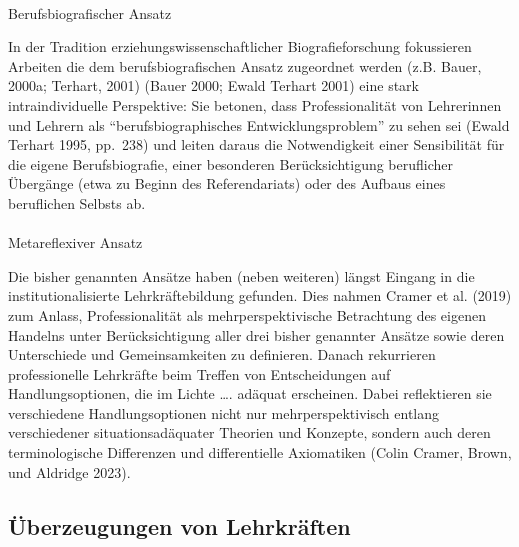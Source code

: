 \documentclass[
  letterpaper,
  DIV=11]{scrartcl}
\makeatletter
\let\oldparagraph\paragraph
\renewcommand{\paragraph}{
    \@ifstar
      \xxxParagraphStar
      \xxxParagraphNoStar
  }
\newcommand{\xxxParagraphStar}[1]{\oldparagraph*{#1}\mbox{}}
\newcommand{\xxxParagraphNoStar}[1]{\oldparagraph{#1}\mbox{}}
\makeatother
\begin{document}
\paragraph{Berufsbiografischer Ansatz}\label{berufsbiografischer-ansatz}

In der Tradition erziehungswissenschaftlicher Biografieforschung
fokussieren Arbeiten die dem berufsbiografischen Ansatz zugeordnet
werden (z.B. Bauer, 2000a; Terhart, 2001) (Bauer 2000; Ewald Terhart
2001) eine stark intraindividuelle Perspektive: Sie betonen, dass
Professionalität von Lehrerinnen und Lehrern als ``berufsbiographisches
Entwicklungsproblem'' zu sehen sei (Ewald Terhart 1995, pp.~238) und
leiten daraus die Notwendigkeit einer Sensibilität für die eigene
Berufsbiografie, einer besonderen Berücksichtigung beruflicher Übergänge
(etwa zu Beginn des Referendariats) oder des Aufbaus eines beruflichen
Selbsts ab.

\paragraph{Metareflexiver Ansatz}\label{metareflexiver-ansatz}

Die bisher genannten Ansätze haben (neben weiteren) längst Eingang in
die institutionalisierte Lehrkräftebildung gefunden. Dies nahmen Cramer
et al. (2019) zum Anlass, Professionalität als mehrperspektivische
Betrachtung des eigenen Handelns unter Berücksichtigung aller drei
bisher genannter Ansätze sowie deren Unterschiede und Gemeinsamkeiten zu
definieren. Danach rekurrieren professionelle Lehrkräfte beim Treffen
von Entscheidungen auf Handlungsoptionen, die im Lichte \ldots. adäquat
erscheinen. Dabei reflektieren sie verschiedene Handlungsoptionen nicht
nur mehrperspektivisch entlang verschiedener situationsadäquater
Theorien und Konzepte, sondern auch deren terminologische Differenzen
und differentielle Axiomatiken (Colin Cramer, Brown, und Aldridge 2023).

\subsection{Überzeugungen von
Lehrkräften}\label{uxfcberzeugungen-von-lehrkruxe4ften}
\end{document}
